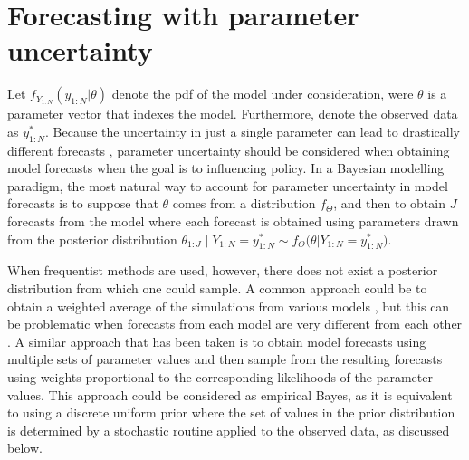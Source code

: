 \section{Forecasting with parameter uncertainty}

Let $f_{Y_{1:N}}(y_{1:N} | \theta)$ denote the pdf of the model under consideration, were $\theta$ is a parameter vector that indexes the model.
Furthermore, denote the observed data as $y_{1:N}^*$.
Because the uncertainty in just a single parameter can lead to drastically different forecasts \cite{saltelli20},
parameter uncertainty should be considered when obtaining model forecasts when the goal is to influencing policy.
In a Bayesian modelling paradigm, the most natural way to account for parameter uncertainty in model forecasts is to suppose that $\theta$ comes from a distribution $f_{\Theta}$, and then to obtain $J$ forecasts from the model where each forecast is obtained using parameters drawn from the posterior distribution $\theta_{1:J} \mid Y_{1:N} = y_{1:N}^* \sim f_{\Theta}\big(\theta | Y_{1:N} = y_{1:N}^*\big)$.

When frequentist methods are used, however, there does not exist a posterior distribution from which one could sample.
A common approach could be to obtain a weighted average of the simulations from various models \cite{hoeting99}, but this can be problematic when forecasts from each model are very different from each other \cite{grueber11}.
A similar approach that has been taken \cite{king15} is to obtain model forecasts using multiple sets of parameter values and then sample from the resulting forecasts using weights proportional to the corresponding likelihoods of the parameter values.
This approach could be considered as empirical Bayes, as it is equivalent to using a discrete uniform prior where the set of values in the prior distribution is determined by a stochastic routine applied to the observed data, as discussed below.

